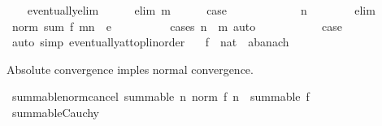\begin{isabellebody}
\ \ \isamarkupfalse%
\ eventually{\isacharunderscore}{\kern0pt}elim\isanewline
\ \ \ \ \isamarkupfalse%
\ {\isacharparenleft}{\kern0pt}elim\ m{\isacharparenright}{\kern0pt}\isanewline
\ \ \ \ \isamarkupfalse%
\ {\isacharquery}{\kern0pt}case\isanewline
\ \ \ \ \isamarkupfalse%
\isanewline
\ \ \ \ \ \ \isamarkupfalse%
\ n\isanewline
\ \ \ \ \ \ \isamarkupfalse%
\ elim\ \isamarkupfalse%
\ {\isachardoublequoteopen}norm\ {\isacharparenleft}{\kern0pt}sum\ f\ {\isacharbraceleft}{\kern0pt}m{\isachardot}{\kern0pt}{\isachardot}{\kern0pt}{\isacharless}{\kern0pt}n{\isacharbraceright}{\kern0pt}{\isacharparenright}{\kern0pt}\ {\isacharless}{\kern0pt}\ e{\isachardoublequoteclose}\isanewline
\ \ \ \ \ \ \ \ \isamarkupfalse%
\ {\isacharparenleft}{\kern0pt}cases\ {\isachardoublequoteopen}n\ {\isasymge}\ m{\isachardoublequoteclose}{\isacharparenright}{\kern0pt}\ auto\isanewline
\ \ \ \ \isamarkupfalse%
\isanewline
\ \ \isamarkupfalse%
\isanewline
\ \ \isamarkupfalse%
\ {\isacharquery}{\kern0pt}case\ \isamarkupfalse%
\ {\isacharparenleft}{\kern0pt}auto\ simp{\isacharcolon}{\kern0pt}\ eventually{\isacharunderscore}{\kern0pt}at{\isacharunderscore}{\kern0pt}top{\isacharunderscore}{\kern0pt}linorder{\isacharparenright}{\kern0pt}\isanewline
{}\isamarkupfalse%
%
\endisatagproof
{\isafoldproof}%
%
\isadelimproof
\isanewline
%
\endisadelimproof
\isanewline
{}\isamarkupfalse%
\isanewline
\ \ \ f\ {\isacharcolon}{\kern0pt}{\isacharcolon}{\kern0pt}\ {\isachardoublequoteopen}nat\ {\isasymRightarrow}\ {\isacharprime}{\kern0pt}a{\isacharcolon}{\kern0pt}{\isacharcolon}{\kern0pt}banach{\isachardoublequoteclose}\isanewline
{}%
\begin{isamarkuptext}%
Absolute convergence imples normal convergence.%
\end{isamarkuptext}\isamarkuptrue%
\isamarkupfalse%
\ summable{\isacharunderscore}{\kern0pt}norm{\isacharunderscore}{\kern0pt}cancel{\isacharcolon}{\kern0pt}\ {\isachardoublequoteopen}summable\ {\isacharparenleft}{\kern0pt}{\isasymlambda}n{\isachardot}{\kern0pt}\ norm\ {\isacharparenleft}{\kern0pt}f\ n{\isacharparenright}{\kern0pt}{\isacharparenright}{\kern0pt}\ {\isasymLongrightarrow}\ summable\ f{\isachardoublequoteclose}\isanewline
%
\isadelimproof
\ \ %
\endisadelimproof
%
\isatagproof
{}\isamarkupfalse%
\ summable{\isacharunderscore}{\kern0pt}Cauchy\isanewline

\end{isabellebody}
